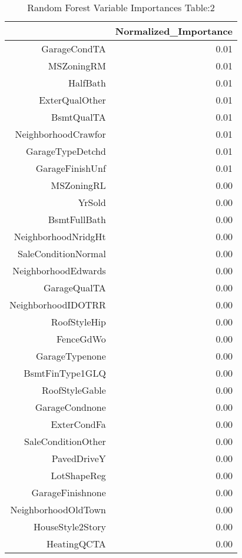 \begin{table}[ht]
\centering
\begin{tabular}{rr}
  \hline
 & Normalized\_Importance \\ 
  \hline
GarageCondTA & 0.01 \\ 
  MSZoningRM & 0.01 \\ 
  HalfBath & 0.01 \\ 
  ExterQualOther & 0.01 \\ 
  BsmtQualTA & 0.01 \\ 
  NeighborhoodCrawfor & 0.01 \\ 
  GarageTypeDetchd & 0.01 \\ 
  GarageFinishUnf & 0.01 \\ 
  MSZoningRL & 0.00 \\ 
  YrSold & 0.00 \\ 
  BsmtFullBath & 0.00 \\ 
  NeighborhoodNridgHt & 0.00 \\ 
  SaleConditionNormal & 0.00 \\ 
  NeighborhoodEdwards & 0.00 \\ 
  GarageQualTA & 0.00 \\ 
  NeighborhoodIDOTRR & 0.00 \\ 
  RoofStyleHip & 0.00 \\ 
  FenceGdWo & 0.00 \\ 
  GarageTypenone & 0.00 \\ 
  BsmtFinType1GLQ & 0.00 \\ 
  RoofStyleGable & 0.00 \\ 
  GarageCondnone & 0.00 \\ 
  ExterCondFa & 0.00 \\ 
  SaleConditionOther & 0.00 \\ 
  PavedDriveY & 0.00 \\ 
  LotShapeReg & 0.00 \\ 
  GarageFinishnone & 0.00 \\ 
  NeighborhoodOldTown & 0.00 \\ 
  HouseStyle2Story & 0.00 \\ 
  HeatingQCTA & 0.00 \\ 
   \hline
\end{tabular}
\caption{Random Forest Variable Importances Table:2} 
\label{tab:importance2}
\end{table}

